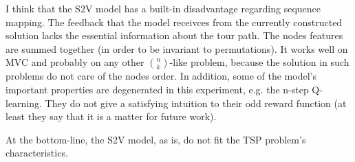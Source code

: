 \documentclass[10pt,a4paper,draft]{article}
\begin{document}
	I think that the S2V model has a built-in disadvantage regarding sequence mapping. The feedback that the model receivces from the currently constructed solution lacks the essential information about the tour path. The nodes features are summed together (in order to be invariant to permutations). It works well on MVC and probably on any other ${n \choose k}$-like problem, because the solution in such problems do not care of the nodes order. 
	In addition, some of the model's important properties are degenerated in this experiment, e.g. the n-step Q-learning. They do not give a satisfying intuition to their odd reward function (at least they say that it is a matter for future work).
	
	At the bottom-line, the S2V model, as is, do not fit the TSP problem's characteristics. 




\end{document}
